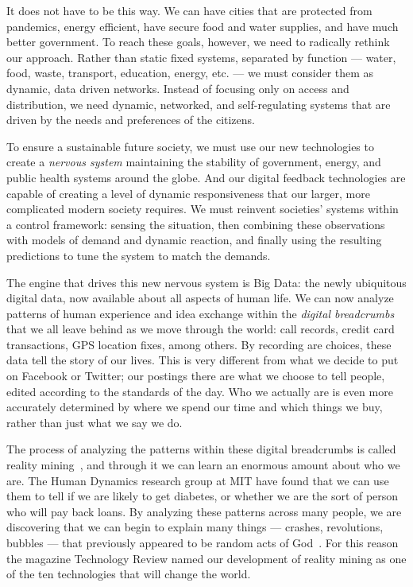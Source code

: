 It does not have to be this way.
We can have cities that are protected from pandemics, energy efficient, have secure food and water supplies, and have much better government.
To reach these goals, however, we need to radically rethink our approach.
Rather than static fixed systems, separated by function --- water, food, waste, transport, education, energy, etc. --- we must consider them as dynamic, data driven networks.
Instead of focusing only on access and distribution, we need dynamic, networked, and self-regulating systems that are driven by the needs and preferences of the citizens.

To ensure a sustainable future society, we must use our new technologies to create a \emph{nervous system} maintaining the stability of government, energy, and public health systems around the globe.
And our digital feedback technologies are capable of creating a level of dynamic responsiveness that our larger, more complicated modern society requires.
We must reinvent societies’ systems within a control framework: sensing the situation, then combining these observations with models of demand and dynamic reaction, and finally using the resulting predictions to tune the system to match the demands.

The engine that drives this new nervous system is Big Data: the newly ubiquitous digital data, now available about all aspects of human life.
We can now analyze patterns of human experience and idea exchange within the \emph{digital breadcrumbs} that we all leave behind as we move through the world: call records, credit card transactions, GPS location fixes, among others.
By recording are choices, these data tell the story of our lives.
This is very different from what we decide to put on Facebook or Twitter; our postings there are what we choose to tell people, edited according to the standards of the day.
Who we actually are is even more accurately determined by where we spend our time and which things we buy, rather than just what we say we do.

The process of analyzing the patterns within these digital breadcrumbs is called reality mining~\cite{eagle2006reality,pentland2009reality}, and through it we can learn an enormous amount about who we are.
The Human Dynamics research group at MIT have found that we can use them to tell if we are likely to get diabetes, or whether we are the sort of person who will pay back loans.
By analyzing these patterns across many people, we are discovering that we can begin to explain many things --- crashes, revolutions, bubbles --- that previously appeared to be random acts of God~\cite{pan2012decoding}.
For this reason the magazine Technology Review named our development of reality mining as one of the ten technologies that will change the world\cite{greene2008reality}. 

